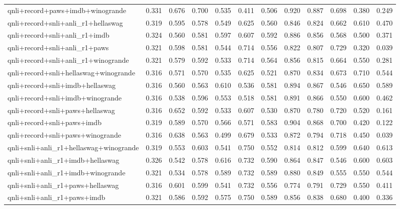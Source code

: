 \begin{table}[t]
\begin{tabular}{lrrrrrrrrrrr}
    qnli+record+paws+imdb+winogrande & 0.331 & 0.676 & 0.700 & 0.535 & 0.411 & 0.506 & 0.920 & 0.887 & 0.698 & 0.380 & 0.249 \\
    qnli+record+snli+anli\_r1+hellaswag & 0.319 & 0.595 & 0.578 & 0.549 & 0.625 & 0.560 & 0.846 & 0.824 & 0.662 & 0.610 & 0.470 \\
    qnli+record+snli+anli\_r1+imdb & 0.324 & 0.560 & 0.581 & 0.597 & 0.607 & 0.592 & 0.886 & 0.856 & 0.568 & 0.500 & 0.371 \\
    qnli+record+snli+anli\_r1+paws & 0.321 & 0.598 & 0.581 & 0.544 & 0.714 & 0.556 & 0.822 & 0.807 & 0.729 & 0.320 & 0.039 \\
    qnli+record+snli+anli\_r1+winogrande & 0.321 & 0.579 & 0.592 & 0.533 & 0.714 & 0.564 & 0.856 & 0.815 & 0.664 & 0.550 & 0.281 \\
    qnli+record+snli+hellaswag+winogrande & 0.316 & 0.571 & 0.570 & 0.535 & 0.625 & 0.521 & 0.870 & 0.834 & 0.673 & 0.710 & 0.544 \\
    qnli+record+snli+imdb+hellaswag & 0.316 & 0.560 & 0.563 & 0.610 & 0.536 & 0.581 & 0.894 & 0.867 & 0.546 & 0.650 & 0.589 \\
    qnli+record+snli+imdb+winogrande & 0.316 & 0.538 & 0.596 & 0.553 & 0.518 & 0.581 & 0.891 & 0.866 & 0.550 & 0.600 & 0.462 \\
    qnli+record+snli+paws+hellaswag & 0.316 & 0.652 & 0.592 & 0.533 & 0.607 & 0.530 & 0.870 & 0.780 & 0.720 & 0.520 & 0.161 \\
    qnli+record+snli+paws+imdb & 0.319 & 0.589 & 0.570 & 0.566 & 0.571 & 0.583 & 0.904 & 0.868 & 0.700 & 0.420 & 0.122 \\
    qnli+record+snli+paws+winogrande & 0.316 & 0.638 & 0.563 & 0.499 & 0.679 & 0.533 & 0.872 & 0.794 & 0.718 & 0.450 & 0.039 \\
    qnli+snli+anli\_r1+hellaswag+winogrande & 0.319 & 0.553 & 0.603 & 0.541 & 0.750 & 0.552 & 0.814 & 0.812 & 0.599 & 0.640 & 0.613 \\
    qnli+snli+anli\_r1+imdb+hellaswag & 0.326 & 0.542 & 0.578 & 0.616 & 0.732 & 0.590 & 0.864 & 0.847 & 0.546 & 0.600 & 0.603 \\
    qnli+snli+anli\_r1+imdb+winogrande & 0.321 & 0.534 & 0.578 & 0.589 & 0.732 & 0.589 & 0.880 & 0.849 & 0.555 & 0.550 & 0.544 \\
    qnli+snli+anli\_r1+paws+hellaswag & 0.316 & 0.601 & 0.599 & 0.541 & 0.732 & 0.556 & 0.774 & 0.791 & 0.729 & 0.550 & 0.411 \\
    qnli+snli+anli\_r1+paws+imdb & 0.321 & 0.586 & 0.592 & 0.575 & 0.750 & 0.589 & 0.856 & 0.838 & 0.680 & 0.400 & 0.336 \\

\end{tabular}
\end{table}
